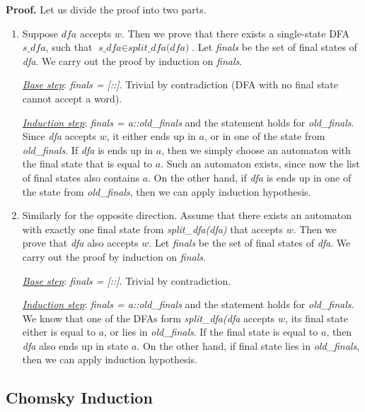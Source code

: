 \textbf{Proof.}
Let us divide the proof into two parts.
\begin{enumerate}
\item Suppose $\textit{dfa}$ accepts $w$. Then we prove that there exists a single-state DFA $\textit{s\_dfa}$, such that $\textit{s\_dfa} \in \textit{split\_dfa(dfa)}$. 
Let \textit{finals} be the set of final states of \textit{dfa}. We carry out the proof by induction on \textit{finals}. 


\textit{\underline{Base step}}: \textit{finals = [::]}. Trivial by contradiction (DFA with no final state cannot accept a word).


\textit{\underline{Induction step}}: \textit{finals = a::old\_finals} and the statement holds for \textit{old\_finals}. Since \textit{dfa} accepts $w$, it either ends up in $a$, or in one of the state from \textit{old\_finals}.
If \textit{dfa} is ends up in $a$, then we simply choose an automaton with the final state that is equal to $a$.
Such an automaton exists, since now the list of final states also contains $a$.
On the other hand, if \textit{dfa} is ends up in one of the state from \textit{old\_finals}, then we can apply induction hypothesis.

\item Similarly for the opposite direction. Assume that there exists an automaton with exactly one final state from \textit{split\_dfa(dfa)} that accepts $w$. Then we prove that \textit{dfa} also accepts $w$. 
Let \textit{finals} be the set of final states of \textit{dfa}. We carry out the proof by induction on \textit{finals}. 


\textit{\underline{Base step}}: \textit{finals = [::]}. Trivial by contradiction.


\textit{\underline{Induction step}}: \textit{finals = a::old\_finals} and the statement holds for \textit{old\_finals}.
We know that one of the DFAs form \textit{split\_dfa(dfa} accepts $w$, its final state either is equal to $a$, or lies in \textit{old\_finals}.
If the final state is equal to $a$, then \textit{dfa} also ends up in state $a$.
On the other hand, if final state lies in \textit{old\_finals}, then we can apply induction hypothesis.
\end{enumerate}


\subsection{Chomsky Induction}
\label{sec:chomsky-induction}

